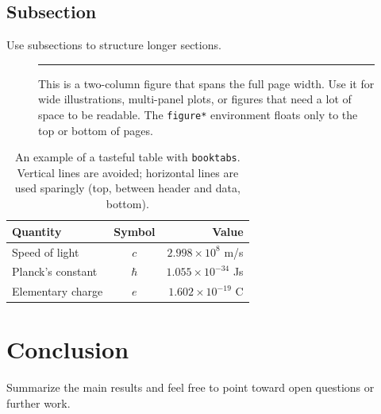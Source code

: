 \documentclass[a4paper,10pt,twocolumn]{article}
\begin{document}
\subsection{Subsection}

Use subsections to structure longer sections.

\begin{figure}[t]
  \centering
  \rule{0.9\linewidth}{3.5cm}   %
  \caption{This is a two-column figure that spans the full page
           width. Use it for wide illustrations, multi-panel plots,
           or figures that need a lot of space to be readable.
           The \texttt{figure*} environment floats only to the top
           or bottom of pages.}
  \label{fig:wide}
\end{figure}

\begin{table}[t]
  \centering
  \caption{An example of a tasteful table with \texttt{booktabs}.
           Vertical lines are avoided; horizontal lines are used
           sparingly (top, between header and data, bottom).}
  \label{tab:example}
  \begin{tabular}{lcr}
    \toprule
    Quantity & Symbol & Value \\
    \midrule
    Speed of light       & $c$      & $2.998 \times 10^8$ m/s \\
    Planck's constant    & $\hbar$  & $1.055 \times 10^{-34}$ Js \\
    Elementary charge    & $e$      & $1.602 \times 10^{-19}$ C \\
    \bottomrule
  \end{tabular}
\end{table}

\section{Conclusion}

Summarize the main results and feel free to point toward open
questions or further work.



\end{document}
